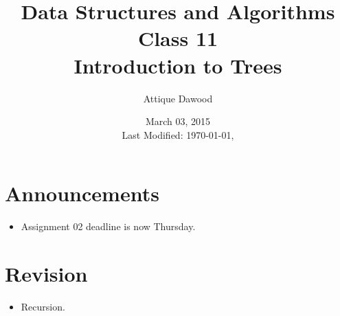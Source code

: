 \documentclass[12pt,a4paper]{article}
\title{Data Structures and Algorithms\\Class 11\\Introduction to Trees}
\author{Attique Dawood}
\date{March 03, 2015\\[0.2cm] Last Modified: \today, \currenttime}
\begin{document}
\maketitle
\section{Announcements}
\begin{itemize}
\item Assignment 02 deadline is now Thursday.
\end{itemize}
\section{Revision}
\begin{itemize}
\item Recursion.
\end{itemize}
\end{document}
